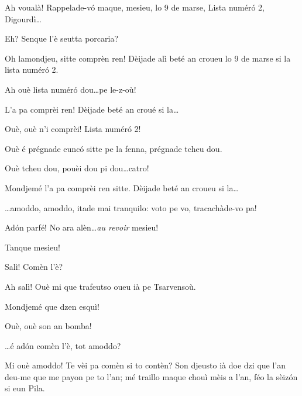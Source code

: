 \begin{drama}
\Cimaspeaks Ah voualà! Rappelade-v\'o maque, mesieu, lo 9 de marse, Lista num\'er\'o 2, Digourdì\ldots

\Pompiolenspeaks Eh? Senque l'è seutta porcaria?

\Cimaspeaks {} Oh lamondjeu, sitte comprèn ren!  Dèijade alì beté an croueu lo 9 de marse si la lista num\'er\'o 2.

\Pompiolenspeaks Ah ouè lista num\'er\'o dou\ldots pe le-z-où!

\Cimaspeaks {} L'a pa comprèi ren!  Dèijade beté an croué si la\ldots

\Pompiolenspeaks {} Ouè, ouè n'i comprèi! Lista num\'er\'o 2!


\Cimaspeaks Ouè é prégnade eunc\'o sitte pe la fenna, prégnade tcheu dou.

\Pompiolenspeaks{} Ouè tcheu dou, pouèi dou pi dou\ldots catro!

\Cimaspeaks {} Mondjemé l'a pa comprèi ren sitte.  Dèijade beté an croueu si la\ldots

\Pompiolenspeaks \ldots amoddo, amoddo, itade mai tranquilo: voto pe vo, tracachàde-vo pa!

\Marcospeaks Ad\'on parfé! No ara alèn\ldots \textit{au revoir} mesieu!

\Cimaspeaks Tanque mesieu!





\Cimaspeaks{} Salì! Comèn l'è?

\Jeanspeaks Ah salì! Ouè mi que trafeutso oueu ià pe Tsarvensoù.

\Cimaspeaks Mondjemé que dzen esquì!

\Jeanspeaks Ouè, ouè son an bomba!

\Cimaspeaks \ldots é ad\'on comèn l'è, tot amoddo?

\Jeanspeaks Mi ouè amoddo! Te vèi pa comèn si to contèn? Son djeusto ià doe dzi que l'an deu-me que me payon pe to l'an; mé traillo maque chouì mèis a l'an, féo la sèiz\'on si eun Pila.


\end{drama}
